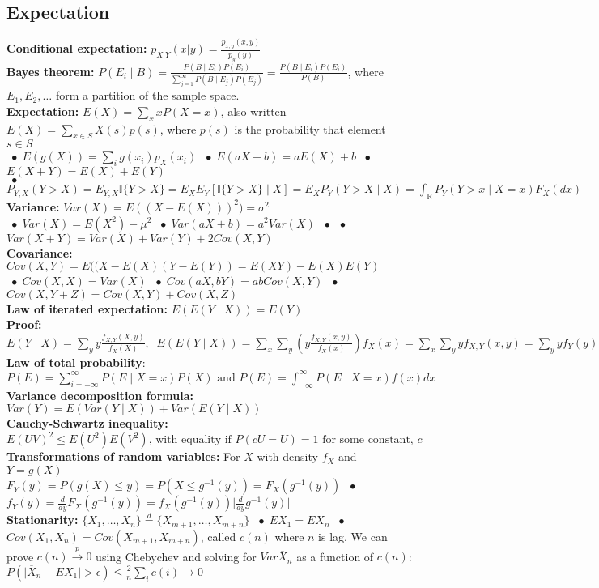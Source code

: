 \documentclass[9pt]{extarticle}
\newcommand{\abs}[1]{\lvert#1\rvert}
\newcommand*\bspace{$\; \bullet \;$}
\begin{document}
\subsection{Expectation}
\textbf{Conditional expectation: } $p_{X|Y}(x|y) = \frac{p_{x,y}(x,y)}{p_y(y)}$\\
\textbf{Bayes theorem: } $P(E_i \mid B) = \frac{P(B \mid E_i)P(E_i)}{\sum_{j=1}^\infty P(B \mid E_j)P(E_j)} = \frac{P(B \mid E_i)P(E_i)}{P(B)}$, where $E_1, E_2, \dots$ form a partition of the sample space.\\
\textbf{Expectation:} $E(X) = \sum_x xP(X=x)$, also written $E(X) = \sum_{x \in S} X(s)p(s)$, where $p(s)$ is the probability that element $s \in S$\\
\bspace $E(g(X)) = \sum_i g(x_i)p_X(x_i)$ \bspace $E(aX + b) = aE(X) + b$ \bspace $E(X + Y) = E(X) + E(Y)$\\
\bspace $P_{Y,X}(Y > X) = E_{Y,X}\mathbb{I}\{Y>X\} = E_XE_Y[\mathbb{I}\{Y>X\} \mid X] = E_XP_Y(Y > X \mid X) = \int_\mathbb{R}P_Y(Y > x \mid X = x)F_X(dx)$\\
\textbf{Variance: } $Var(X) = E((X - E(X)))^2) = \sigma^2$\\
\bspace $Var(X) = E(X^2) - \mu^2$ \bspace $Var(aX+b) = a^2Var(X)$ \bspace  \bspace $Var(X + Y) = Var(X) + Var(Y) + 2Cov(X, Y)$\\
\textbf{Covariance: } $Cov(X, Y) = E((X - E(X)(Y - E(Y)) = E(XY) - E(X)E(Y)$\\
\bspace $Cov(X, X) = Var(X)$ \bspace $Cov(aX, bY) = abCov(X, Y)$ \bspace $Cov(X, Y+Z) = Cov(X, Y) + Cov(X, Z)$\\
\textbf{Law of iterated expectation: } $E(E(Y\mid X)) = E(Y)$\\
\textbf{Proof: }$E(Y\mid X) = \sum_y y\frac{f_{X, Y}(X, y)}{f_X(X)}, \; \; E(E(Y\mid X)) = \sum_x \sum_y \left ( y\frac{f_{X, Y}(x, y)}{f_X(x)} \right ) f_X(x) = \sum_x \sum_y y f_{X, Y}(x, y) = \sum_y y f_{Y}(y) = E(Y)$\\
\textbf{Law of total probability}: $P(E) = \sum_{i=-\infty}^\infty P(E \mid X = x)P(X) \textrm{ and } P(E) = \int_{-\infty}^\infty P(E \mid X=x)f(x)dx$\\
\textbf{Variance decomposition formula: } $Var(Y) = E(Var(Y\mid X)) + Var(E(Y \mid X))$\\
\textbf{Cauchy-Schwartz inequality: }$E(UV)^2 \leq E(U^2)E(V^2) \textrm{, with equality if } P(cU=U) = 1 \textrm{ for some constant, } c$\\
\textbf{Transformations of random variables: } For $X$ with density $f_X$ and $Y = g(X)$\\
$F_Y(y) = P(g(X)\leq y) = P(X \leq g^{-1}(y)) = F_X(g^{-1}(y))$ \bspace $f_Y(y) = \frac{d}{dy}F_X(g^{-1}(y)) = f_X(g^{-1}(y))\abs{\frac{d}{dy}g^{-1}(y)}$\\
\textbf{Stationarity:} $\{X_1, \dots, X_n\} \overset{d}{=} \{X_{m+1}, \dots, X_{m+n}\}$ \bspace $EX_1 = EX_n$ \bspace $Cov(X_1, X_n) = Cov(X_{m+1}, X_{m+n})$, called $c(n)$ where $n$ is lag. We can prove $c(n) \overset{p}{\longrightarrow} 0$ using Chebychev and solving for $Var \overline{X}_n$ as a function of $c(n)$: $P(\abs{\overline{X}_n - EX_1} > \epsilon) \leq \frac{2}{n}\sum_i c(i) \longrightarrow 0$
 
\end{document}
